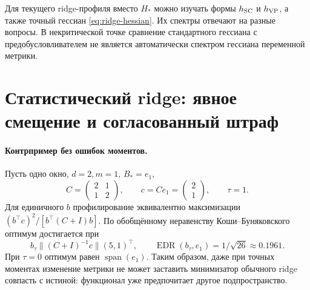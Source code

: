 \documentclass[11pt,a4paper]{article}
\newcommand{\spn}{\operatorname{span}}
\newcommand{\EDR}{\operatorname{EDR}}
\theoremstyle{remark}
\begin{document}
Для текущего ridge-профиля вместо $H_*$ можно изучать формы
$h_{\rm SC}$ и $h_{\rm VP}$, а также точный гессиан
\eqref{eq:ridge-hessian}. Их спектры отвечают на разные вопросы.
В некритической точке сравнение стандартного гессиана с предобусловливателем
не является автоматически спектром гессиана переменной метрики.

\section{Статистический ridge: явное смещение и согласованный штраф}

\paragraph{Контрпример без ошибок моментов.}
Пусть одно окно, $d=2,m=1$, $B_*=e_1$,
\[
 C=\begin{pmatrix}2&1\\1&2\end{pmatrix},\qquad
 c=Ce_1=\begin{pmatrix}2\\1\end{pmatrix},\qquad\tau=1.
\]
Для единичного $b$ профилирование эквивалентно максимизации
$ (b^\top c)^2/[b^\top(C+I)b]$.
По обобщённому неравенству Коши--Буняковского оптимум достигается при
\[
 b_\tau\parallel(C+I)^{-1}c\parallel(5,1)^\top,
 \qquad \EDR(b_\tau,e_1)=1/\sqrt{26}\approx0.1961.
\]
При $\tau=0$ оптимум равен $\spn(e_1)$.
Таким образом, даже при точных моментах изменение метрики не может
заставить минимизатор обычного ridge совпасть с истиной: функционал
уже предпочитает другое подпространство.
\end{document}
